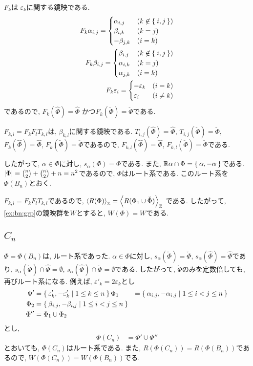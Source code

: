 $F_{k}$は
$\varepsilon_{k}$に関する鏡映である.
\begin{align*}
  F_{k}\alpha_{i,j}=
  \begin{cases}
    \alpha_{i,j} & (k\not\in \Set{i,j})\\
    \beta_{i,k} & (k=j)\\
    -\beta_{j,k} & (i=k)\\
  \end{cases}
  \\
  F_k \beta_{i,j}=
  \begin{cases}
    \beta_{i,j} & (k\not\in \Set{i,j})\\
    \alpha_{i,k} & (k=j)\\
    \alpha_{j,k} & (i=k)
  \end{cases}
  \\
  F_{k}\varepsilon_{i}=
  \begin{cases}
    -\varepsilon_{k}&(i=k)\\
    \varepsilon_{i} &(i\neq k)
  \end{cases}
\end{align*}
であるので, 
$F_{k}(\hat\Phi)=\hat\Phi$
かつ$F_{k}(\check\Phi)=\check\Phi$である.

$F_{k,l}=F_kF_lT_{k,l}$は, $\beta_{k,l}$に関する鏡映である.
$T_{i,j}(\hat\Phi)=\hat\Phi$,
$T_{i,j}(\check\Phi)=\check\Phi$,
$F_{k}(\hat\Phi)=\hat\Phi$,
$F_{k}(\check\Phi)=\check\Phi$であるので,
$F_{k,l}(\hat\Phi)=\hat\Phi$,
$F_{k,l}(\check\Phi)=\check\Phi$である.

したがって, $\alpha\in \Phi$に対し,
$s_{\alpha}(\Phi)=\Phi$である.
また,
$\mathbb{R}\alpha\cap\Phi=\Set{\alpha,-\alpha}$である.
$\left|\Phi\right|=\binom{n}{2}+\binom{n}{2}+n=n^2$であるので,
$\Phi$はルート系である.
このルート系を$\Phi(B_{n})$とおく.

$F_{k,l}=F_kF_lT_{k,l}$であるので,
$\Braket{R(\Phi)}_{\mathbb{Z}}=\Braket{R(\Phi_1\cup \check{\Phi})}_{\mathbb{Z}}$
である.
したがって,
\cref{ex:bn:grp}の鏡映群を$W$とすると,
$W(\Phi)=W$である.

\subsection{$C_{n}$}
\label{ex:cn:root}
$\Phi=\Phi(B_n)$は,
ルート系であった.
$\alpha\in \Phi$に対し,
$s_{\alpha}(\check\Phi)=\check\Phi$,
$s_{\alpha}(\hat\Phi)=\hat\Phi$であり,
$s_{\alpha}(\check\Phi)\cap\hat\Phi=\emptyset$,
$s_{\alpha}(\hat\Phi)\cap\check\Phi=\emptyset$である.
したがって, $\check\Phi$のみを定数倍しても,
再びルート系になる.
例えば, $\varepsilon'_k=2\varepsilon_k$とし
\begin{align*}
  \Phi'&=\Set{\varepsilon'_k,-\varepsilon'_k|1\leq k\leq n}
  \Phi_1&=\Set{\alpha_{i,j},-\alpha_{i,j}|1\leq i<j\leq n}\\
  \Phi_2&=\Set{\beta_{i,j},-\beta_{i,j}|1\leq i<j\leq n}\\
  \Phi''&=\Phi_1\cup \Phi_2\\
\end{align*}
とし,
\begin{align*}
  \Phi(C_n)&=\Phi'\cup\Phi''
\end{align*}
とおいても, $\Phi(C_n)$はルート系である.
また,
$R(\Phi(C_n))=R(\Phi(B_n))$であるので,
$W(\Phi(C_n))=W(\Phi(B_n))$でる.


